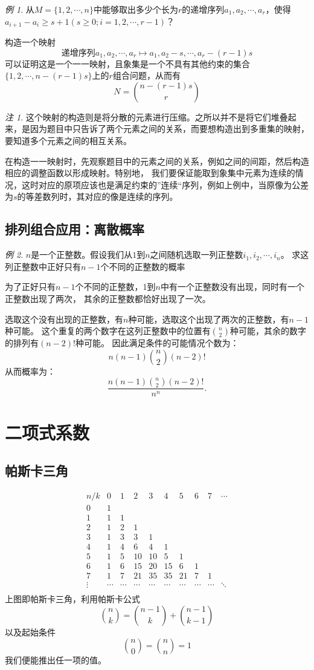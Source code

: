 \documentclass[a4paper,11pt]{article}%
\theoremstyle{remark}
\newtheorem*{remark}{注}
\theoremstyle{remark}
\newtheorem*{example}{例}
\theoremstyle{definition}
\theoremstyle{definition}
\theoremstyle{definition}
\begin{document}
\begin{example}
    从$M=\{1,2,\cdots,n\}$中能够取出多少个长为$r$的递增序列$a_1,a_2,\cdots,a_r$，使得$a_{i+1}-a_i\geq s+1(s\geq 0;i=1,2,\cdots,r-1)$？

    构造一个映射
    \[\text{递增序列}a_1,a_2,\cdots,a_r\longmapsto a_1,a_2-s,\cdots,a_r-(r-1)s\]
    可以证明这是一个一一映射，且象集是一个不具有其他约束的集合$\{1,2,\cdots,n-(r-1)s\}$上的$r$组合问题，从而有
    \[N=\binom{n-(r-1)s}{r}\]
\end{example}
\begin{remark}
    这个映射的构造则是将分散的元素进行压缩。之所以并不是将它们堆叠起来，是因为题目中只告诉了两个元素之间的关系，而要想构造出到多重集的映射，要知道多个元素之间的相互关系。
\end{remark}
在构造一一映射时，先观察题目中的元素之间的关系，例如之间的间距，然后构造相应的调整函数以形成映射。特别地，
我们要保证能取到象集中元素为连续的情况，这时对应的原项应该也是满足约束的”连续“序列，例如上例中，当原像为公差为$s$的等差数列时，其对应的像是连续的序列。
\subsection{排列组合应用：离散概率}
\begin{example}$n$是一个正整数。假设我们从$1$到$n$之间随机选取一列正整数$i_1,i_2,\cdots,i_n$。
    求这列正整数中正好只有$n-1$个不同的正整数的概率

    为了正好只有$n-1$个不同的正整数，1到$n$中有一个正整数没有出现，同时有一个正整数出现了两次，
    其余的正整数都恰好出现了一次。

    选取这个没有出现的正整数，有$n$种可能，选取这个出现了两次的正整数，有$n-1$种可能。
    这个重复的两个数字在这列正整数中的位置有$\binom{n}{2}$种可能，其余的数字的排列有$(n-2)!$种可能。
    因此满足条件的可能情况个数为：
    \[n(n-1)\binom{n}{2}(n-2)!\]
    从而概率为：
    \[\frac{n(n-1)\binom{n}{2}(n-2)!}{n^n}.\]
\end{example}
\section{二项式系数}
\subsection{帕斯卡三角}
\[\begin{matrix}
    n/k&0&1&2&3&4&5&6&7&\cdots\\
    0&1\\
    1&1&1\\
    2&1&2&1\\
    3&1&3&3&1\\
    4&1&4&6&4&1\\
    5&1&5&10&10&5&1\\
    6&1&6&15&20&15&6&1\\
    7&1&7&21&35&35&21&7&1\\
    \vdots&\cdots&\cdots&\cdots&\cdots&\cdots&\cdots&\cdots&\cdots&\ddots\\
\end{matrix}\]
上图即帕斯卡三角，利用帕斯卡公式
\[\binom{n}{k}=\binom{n-1}{k}+\binom{n-1}{k-1}\]
以及起始条件
\[\binom{n}{0}=\binom{n}{n}=1\]
我们便能推出任一项的值。
\end{document}
